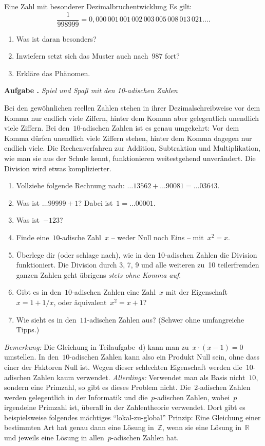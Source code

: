 \documentclass[a4paper,ngerman,twoside]{scrartcl}
\newlength{\aufgabenskip}
\newcounter{aufgabennummer}
\newenvironment{aufgabe}[1]{
  \refstepcounter{aufgabennummer}
  \textbf{Aufgabe \theaufgabennummer.} \emph{#1} \par
}{\vspace{\aufgabenskip}}
\newenvironment{aufgabe*}[1]{
  \refstepcounter{aufgabennummer}
  \textbf{Aufgabe* \theaufgabennummer.} \emph{#1} \par
}{\vspace{\aufgabenskip}}
\begin{document}
\begin{aufgabe*}{Eine Zahl mit besonderer Dezimalbruchentwicklung}
Es gilt:
\[ \frac{1}{998999} =
  0{,}000\,001\,001\,002\,003\,005\,008\,013\,021\ldots. \]
\begin{enumerate}
\item Was ist daran besonders?
\item Inwiefern setzt sich das Muster auch nach~$987$ fort?
\item Erkläre das Phänomen.
\end{enumerate}
\end{aufgabe*}

\begin{aufgabe}{Spiel und Spaß mit den 10-adischen Zahlen}
Bei den gewöhnlichen reellen Zahlen stehen in ihrer Dezimalschreibweise vor dem
Komma nur endlich viele Ziffern, hinter dem Komma aber gelegentlich unendlich
viele Ziffern. Bei den~$10$-adischen Zahlen ist es genau umgekehrt: Vor dem
Komma dürfen unendlich viele Ziffern stehen, hinter dem Komma dagegen nur
endlich viele. Die Rechenverfahren zur Addition, Subtraktion und
Multiplikation, wie man sie aus der Schule kennt, funktionieren weitestgehend
unverändert. Die Division wird etwas komplizierter.
\begin{enumerate}
\item Vollziehe folgende Rechnung nach:
$\ldots 13562 + \ldots 90081 = \ldots 03643$.
\item Was ist $\ldots 99999 + 1$? Dabei ist~$1 = \ldots 00001$.
\item Was ist~$-123$?
\item Finde eine~$10$-adische Zahl~$x$ -- weder Null noch Eins -- mit~$x^2 = x$.
\item Überlege dir (oder schlage nach), wie in den 10-adischen Zahlen die
Division funktioniert. Die Division durch 3, 7, 9 und alle weiteren zu~10
teilerfremden ganzen Zahlen geht übrigens \emph{stets ohne Komma auf}.
\item Gibt es in den~$10$-adischen Zahlen eine Zahl~$x$ mit der
Eigenschaft~$x = 1 + 1/x$, oder äquivalent~$x^2 = x + 1$?
\item Wie sieht es in den~$11$-adischen Zahlen aus? (Schwer ohne umfangreiche
Tipps.)
\end{enumerate}
{\scriptsize
\emph{Bemerkung:} Die Gleichung in Teilaufgabe~d) kann man zu~$x \cdot (x-1) =
0$ umstellen. In den~$10$-adischen Zahlen kann also ein Produkt Null sein, ohne
dass einer der Faktoren Null ist. Wegen dieser schlechten Eigenschaft werden
die~$10$-adischen Zahlen kaum verwendet. \emph{Allerdings:} Verwendet man als
Basis nicht~$10$, sondern eine Primzahl, so gibt es dieses Problem nicht.
Die~$2$-adischen Zahlen werden gelegentlich in der Informatik und
die~$p$-adischen Zahlen, wobei~$p$ irgendeine Primzahl ist, überall in der
Zahlentheorie verwendet. Dort gibt es beispielsweise folgendes mächtiges
"`lokal-zu-global"' Prinzip: Eine Gleichung einer bestimmten Art hat genau dann
eine Lösung in~$\mathbb{Z}$, wenn sie eine Lösung in~$\mathbb{R}$ und jeweils
eine Lösung in allen~$p$-adischen Zahlen hat.\par}
\end{aufgabe}
\end{document}
